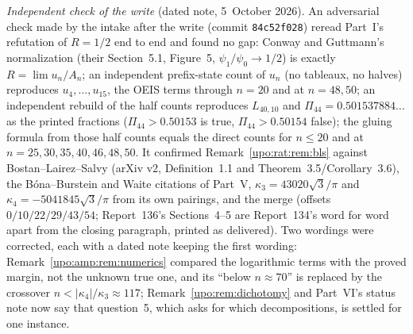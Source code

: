 \documentclass[11pt,letterpaper]{article}
\theoremstyle{remark}\newtheorem{remark}[theorem]{Remark}
\numberwithin{equation}{section}
\newcommand{\file}[1]{\nolinkurl{#1}}
\begin{document}
\emph{Independent check of the write} (dated note, 5~October 2026). An adversarial check made by the intake after the write (commit \file{84c52f028}) reread Part~I's refutation of $R=1/2$ end to end and found no gap: Conway and Guttmann's normalization (their Section~5.1, Figure~5, $\psi_1/\psi_0\to1/2$) is exactly $R=\lim u_n/A_n$; an independent prefix-state count of $u_n$ (no tableaux, no halves) reproduces $u_4,\dots,u_{15}$, the OEIS terms through $n=20$ and at $n=48,50$; an independent rebuild of the half counts reproduces $L_{40,10}$ and $\Pi_{44}=0.501537884\ldots$ as the printed fractions ($\Pi_{44}>0.50153$ is true, $\Pi_{44}>0.50154$ false); the gluing formula from those half counts equals the direct counts for $n\le20$ and at $n=25,30,35,40,46,48,50$. It confirmed Remark~\ref{upo:rat:rem:bls} against Bostan--Lairez--Salvy (arXiv v2, Definition~1.1 and Theorem~3.5/Corollary~3.6), the Bóna--Burstein and Waite citations of Part~V, $\kappa_3=43020\sqrt3/\pi$ and $\kappa_4=-5041845\sqrt3/\pi$ from its own pairings, and the merge (offsets $0/10/22/29/43/54$; Report~136's Sections~4--5 are Report~134's word for word apart from the closing paragraph, printed as delivered). Two wordings were corrected, each with a dated note keeping the first wording: Remark~\ref{upo:amp:rem:numerics} compared the logarithmic terms with the proved margin, not the unknown true one, and its ``below $n\approx70$'' is replaced by the crossover $n<|\kappa_4|/\kappa_3\approx117$; Remark~\ref{upo:rem:dichotomy} and Part~VI's status note now say that question~5, which asks for which decompositions, is settled for one instance.
\end{document}
